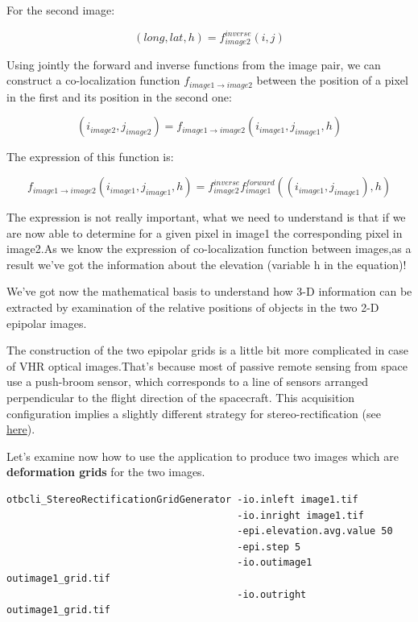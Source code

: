 For the second image:

\begin{equation}
   (long,lat,h) = f^{inverse}_{image2}(i,j)
\end{equation}

Using jointly the forward and inverse functions from the image pair, we can
construct a co-localization function $f_{image1 \rightarrow image2}$ between
the position of a pixel in the first and its position in the second one:

\begin{equation}
(i_{image2},j_{image2}) = f_{image1 \rightarrow image2} (i_{image1} , j_{image1} , h)
\end{equation}

The expression of this function is:

\begin{equation}
f_{image1 \rightarrow image2} (i_{image1} , j_{image1} , h) =  f^{inverse}_{image2} f^{forward}_{image1}((i_{image1} , j_{image1}), h)
\end{equation}

The expression is not really important, what we need to understand is that if we
are now able to determine for a given pixel in image1 the corresponding pixel in
image2.As we know the expression of co-localization function between images,as a
result we've got the information about the elevation (variable h in the
equation)!

We've got now the mathematical basis to understand how 3-D information can be
extracted by examination of the relative positions of objects in the two 2-D
epipolar images.

The construction of the two epipolar grids is a little bit more complicated in
case of VHR optical images.That's because most of passive remote sensing from
space use a push-broom sensor, which corresponds to a line of sensors arranged
perpendicular to the flight direction of the spacecraft.  This acquisition
configuration implies a slightly different strategy for stereo-rectification
(see
\href{http://en.wikipedia.org/wiki/Epipolar_geometry#Epipolar_geometry_of_pushbroom_sensor}{here}).

Let's examine now how to use the 
application to produce two images which are \textbf{deformation grids} for
the two images.

\begin{verbatim}
otbcli_StereoRectificationGridGenerator -io.inleft image1.tif
                                        -io.inright image1.tif
                                        -epi.elevation.avg.value 50
                                        -epi.step 5
                                        -io.outimage1 outimage1_grid.tif
                                        -io.outright outimage1_grid.tif
\end{verbatim}

